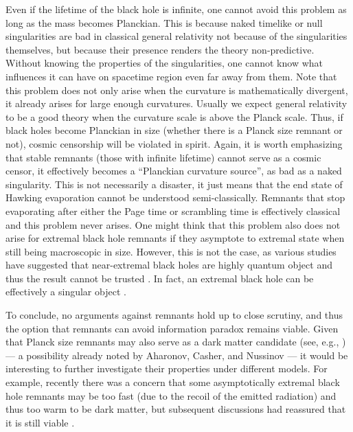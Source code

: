 \documentclass[preprintnumbers, floatfix, preprintnumbers, letterpaper, twocolumn, superscriptaddress,nofootinbib]{revtex4-2}
\begin{document}
Even if the lifetime of the black hole is infinite, one cannot avoid this problem as long as the mass becomes Planckian. This is because naked timelike or null singularities are bad in classical general relativity not because of the singularities themselves, but because their presence renders the theory non-predictive. Without knowing the properties of the singularities, one cannot know what influences it can have on spacetime region even far away from them. Note that this problem does not only arise when the curvature is mathematically divergent, it already arises for large enough curvatures. Usually we expect general relativity to be a good theory when the curvature scale is above the Planck scale. Thus, if black holes become Planckian in size (whether there is a Planck size remnant or not), cosmic censorship will be violated in spirit. Again, it is worth emphasizing that stable remnants (those with infinite lifetime) cannot serve as a cosmic censor, it effectively becomes a ``Planckian curvature source'', as bad as a naked singularity. This is not necessarily a disaster, it just means that the end state of Hawking evaporation cannot be understood semi-classically. Remnants that stop evaporating after either the Page time or scrambling time is effectively classical and this problem never arises. One might think that this problem also does not arise for extremal black hole remnants if they asymptote to extremal state when still being macroscopic in size. However, this is not the case, as various studies have suggested that near-extremal black holes are highly quantum object and thus the result cannot be trusted \cite{0209039,1005.2999,2210.02473,2303.07358,2307.10423,2309.04110,2409.08236}. In fact, an extremal black hole can be effectively a singular object \cite{0209039,2210.02473,2303.07358}.

To conclude, no arguments against remnants hold up to close scrutiny, and thus the option that remnants can avoid information paradox remains viable. Given that Planck size remnants may also serve as a dark matter candidate (see, e.g., \cite{MacGibbon,0406514,0205106,1805.03872}) --- a possibility already noted by  Aharonov,
Casher, and Nussinov \cite{ACN} --- it would be interesting to further investigate their properties under different models. For example, recently there was a concern that some asymptotically extremal black hole remnants may be too fast (due to the recoil of the emitted radiation) \cite{2102.06517} and thus too warm to be dark matter, but subsequent discussions had reassured that it is still viable \cite{2104.08919,2105.01627}. 
\end{document}
